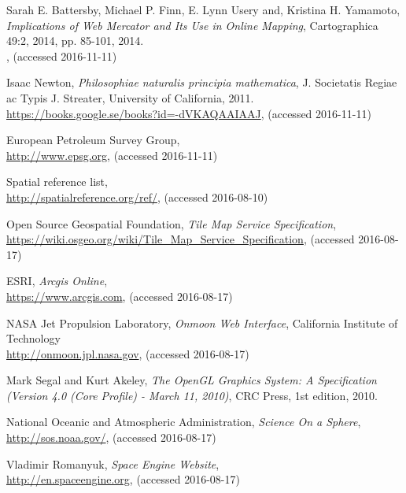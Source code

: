 \begin{thebibliography}{99}
  Sarah E. Battersby, Michael P. Finn, E. Lynn Usery and, Kristina H. Yamamoto,
  \emph{Implications of Web Mercator and Its Use in Online Mapping},
  Cartographica 49:2, 2014, pp. 85-101,
  2014. \\
  ,
  (accessed 2016-11-11)

  Isaac Newton,
  \emph{Philosophiae naturalis principia mathematica},
  J. Societatis Regiae ac Typis J. Streater,
  University of California,
  2011. \\
  \url{https://books.google.se/books?id=-dVKAQAAIAAJ},
  (accessed 2016-11-11)
  
  European Petroleum Survey Group,
  \\
  \url{http://www.epsg.org},
  (accessed 2016-11-11)
  
  Spatial reference list,
  \\
  \url{http://spatialreference.org/ref/},
  (accessed 2016-08-10)


  Open Source Geospatial Foundation,
  \emph{Tile Map Service Specification},
  \\
  \url{https://wiki.osgeo.org/wiki/Tile_Map_Service_Specification},
  (accessed 2016-08-17)
  
  ESRI,
  \emph{Arcgis Online},
  \\
  \url{https://www.arcgis.com},
  (accessed 2016-08-17)

  NASA Jet Propulsion Laboratory,
  \emph{Onmoon Web Interface},
  California Institute of Technology
  \\
  \url{http://onmoon.jpl.nasa.gov},
  (accessed 2016-08-17)
  
  Mark Segal and Kurt Akeley,
  \emph{The OpenGL Graphics System: A Specification (Version 4.0 (Core Profile) - March 11, 2010)},
  CRC Press,
  1st edition,
  2010.
  
  National Oceanic and Atmospheric Administration,
  \emph{Science On a Sphere},
  \\
  \url{http://sos.noaa.gov/},
  (accessed 2016-08-17)
  
  Vladimir Romanyuk,
  \emph{Space Engine Website},
  \\
  \url{http://en.spaceengine.org},
  (accessed 2016-08-17)
  

\end{thebibliography}
